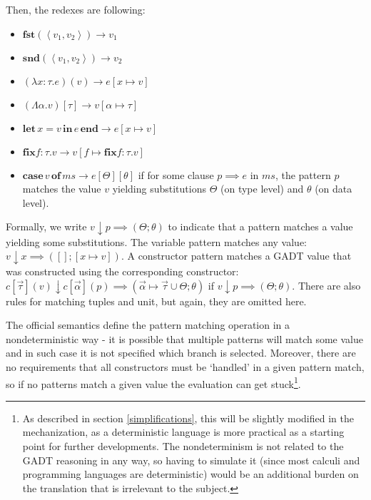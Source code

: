 Then, the redexes are following:

\begin{itemize}
  \item $\mathbf{fst}(\left\langle v_1, v_2 \right\rangle) \longrightarrow v_1$
  \item $\mathbf{snd}(\left\langle v_1, v_2 \right\rangle) \longrightarrow v_2$
  \item $(\lambda x : \tau. e)(v) \longrightarrow e[x \mapsto v]$
  \item $(\Lambda \alpha. v)[\tau] \longrightarrow v[\alpha \mapsto \tau]$
  \item $\mathbf{let} \, x = v \, \mathbf{in} \, e \, \mathbf{end} \longrightarrow e[x \mapsto v]$
  \item $\mathbf{fix} f : \tau. v \longrightarrow v[f \mapsto \mathbf{fix} f : \tau. v]$
  \item $\mathbf{case} \, v \, \mathbf{of} \, ms \longrightarrow e[\Theta][\theta]$ if for some clause $p \implies e$ in $ms$, the pattern $p$ matches the value $v$ yielding substitutions $\Theta$ (on type level) and $\theta$ (on data level).
\end{itemize}

Formally, we write $v \downarrow p \implies (\Theta; \theta)$ to indicate that a pattern matches a value yielding some substitutions. The variable pattern matches any value: $v \downarrow x \implies ([]; [x \mapsto v])$. A constructor pattern matches a GADT value that was constructed using the corresponding constructor: $c[\overrightarrow{\tau}](v) \downarrow c[\overrightarrow{\alpha}](p) \implies (\overrightarrow{\alpha} \mapsto \overrightarrow{\tau} \cup \Theta; \theta)$ if $v \downarrow p \implies (\Theta; \theta)$. There are also rules for matching tuples and unit, but again, they are omitted here.

The official semantics define the pattern matching operation in a nondeterministic way - it is possible that multiple patterns will match some value and in such case it is not specified which branch is selected. Moreover, there are no requirements that all constructors must be `handled' in a given pattern match, so if no patterns match a given value the evaluation can get stuck\footnote{As described in section \ref{simplifications}, this will be slightly modified in the mechanization, as a deterministic language is more practical as a starting point for further developments. The nondeterminism is not related to the GADT reasoning in any way, so having to simulate it (since most calculi and programming languages are deterministic) would be an additional burden on the translation that is irrelevant to the subject.}.

